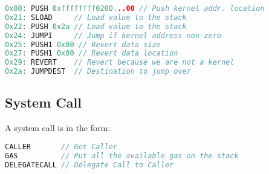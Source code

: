 \documentclass[english,a4paper]{article}
\begin{document}
\begin{minipage}{\linewidth}
\small
\begin{lstlisting}[language=c,commentstyle=\color{mygreen},basicstyle=\ttfamily,
  identifierstyle=\color{blue},
  caption=Sequence of steps which constitutes an execution guard.]
0x00: PUSH 0xffffffff0200...00 // Push kernel addr. location
0x21: SLOAD     // Load value to the stack
0x22: PUSH 0x2a // Load value to the stack
0x24: JUMPI     // Jump if kernel address non-zero
0x25: PUSH1 0x00 // Revert data size
0x27: PUSH1 0x00 // Revert data location
0x29: REVERT    // Revert because we are not a kernel
0x2a: JUMPDEST  // Destination to jump over
\end{lstlisting}
\end{minipage}

\subsection{System Call}
A system call is in the form:

\begin{minipage}{\linewidth}
\small
\begin{lstlisting}[language=c,commentstyle=\color{mygreen},basicstyle=\ttfamily,
  identifierstyle=\color{blue},
  caption=Sequence of steps to perform a system call.]
CALLER       // Get Caller
GAS          // Put all the available gas on the stack
DELEGATECALL // Delegate Call to Caller
\end{lstlisting}
\end{minipage}
\end{document}
